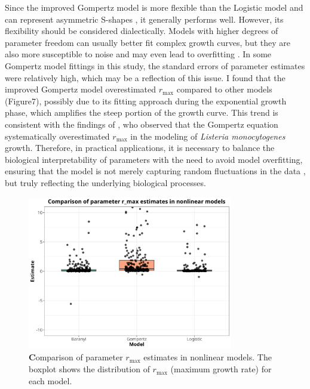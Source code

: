 \documentclass[12pt]{article}
\begin{document}
Since the improved Gompertz model is more flexible than the Logistic model and can represent asymmetric S-shapes \citep{Gibson1987}, it generally performs well. However, its flexibility should be considered dialectically. Models with higher degrees of parameter freedom can usually better fit complex growth curves, but they are also more susceptible to noise and may even lead to overfitting \citep{Merow2014}. In some Gompertz model fittings in this study, the standard errors of parameter estimates were relatively high, which may be a reflection of this issue. I found that the improved Gompertz model overestimated $r_{\text{max}}$ compared to other models (Figure7), possibly due to its fitting approach during the exponential growth phase, which amplifies the steep portion of the growth curve. This trend is consistent with the findings of \citet{Membre2002}, who observed that the Gompertz equation systematically overestimated $r_{\text{max}}$ in the modeling of \textit{Listeria monocytogenes} growth. Therefore, in practical applications, it is necessary to balance the biological interpretability of parameters with the need to avoid model overfitting, ensuring that the model is not merely capturing random fluctuations in the data \citep{CawleyTalbot2010}, but truly reflecting the underlying biological processes.

\begin{figure}[htbp]
    \centering
    \includegraphics[width=0.8\textwidth]{../results/nonlinear_parameter_comparison_r_max.png}
    \caption{%
        \textbf Comparison of parameter \(r_{\max}\) estimates in nonlinear models.
        The boxplot shows the distribution of \(r_{\max}\) (maximum growth rate) for each model. 
    }
    \label{fig:r_max_estimates}
\end{figure}
\end{document}
